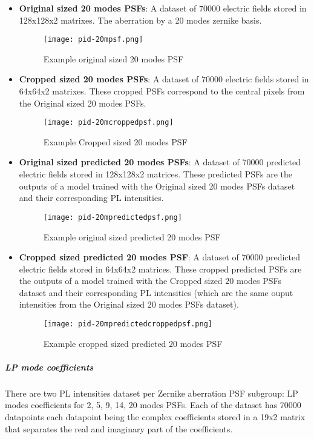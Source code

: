 \begin{itemize}
				\item \textbf{Original sized 20 modes PSFs}: A dataset of 70000 electric fields stored in 128x128x2 matrixes. The aberration by a 20 modes zernike basis.
				\begin{figure*}[ht!]
					\centering
					\texttt{[image: pid-20mpsf.png]}
					\caption{Example original sized 20 modes PSF}\hspace{\fill}
				\end{figure*}				
				\item \textbf{Cropped sized 20 modes PSFs}:  A dataset of 70000 electric fields stored in 64x64x2 matrixes. These cropped  PSFs correspond to the central pixels from the Original sized 20 modes PSFs.
				\begin{figure*}[ht!]
					\centering
					\texttt{[image: pid-20mcroppedpsf.png]}
					\caption{Example Cropped sized 20 modes PSF}\hspace{\fill}
				\end{figure*}			
				\item \textbf{Original sized predicted 20 modes PSFs}:  A dataset of 70000 predicted electric fields stored in 128x128x2 matrices. These predicted PSFs are the outputs of a model trained with the Original sized 20 modes PSFs dataset and their corresponding PL intensities.
				\begin{figure*}[ht!]
					\centering
					\texttt{[image: pid-20mpredictedpsf.png]}
					\caption{Example original sized predicted 20 modes PSF}\hspace{\fill}
				\end{figure*}			
				\item \textbf{Cropped sized predicted 20 modes PSF}: A dataset of 70000 predicted electric fields stored in 64x64x2 matrices. These cropped predicted PSFs are the outputs of a model trained with the Cropped sized 20 modes PSFs dataset and their corresponding PL intensities (which are the same ouput intensities from the Original sized 20 modes PSFs dataset).
				\begin{figure*}[ht!]
					\centering
					\texttt{[image: pid-20mpredictedcroppedpsf.png]}
					\caption{Example cropped sized predicted 20 modes PSF}\hspace{\fill}
				\end{figure*}
				\FloatBarrier
			\end{itemize}
			
		\subparagraph{LP mode coefficients}
			There are two PL intensities dataset per Zernike aberration PSF subgroup: LP modes coefficients for 2, 5, 9, 14, 20 modes PSFs. Each of the dataset has 70000 datapoints each datapoint being the complex coefficients stored in a 19x2 matrix that separates the real and imaginary part of the coefficients.\\
			
